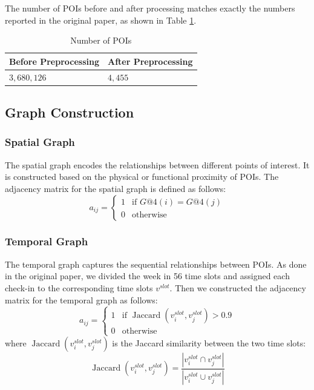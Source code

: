 \documentclass[twocolumn,twoside]{article}
\DeclareMathOperator{\jax}{Jaccard}
\begin{document}
The number of POIs before and after processing matches exactly
the numbers reported in the original paper, as shown in Table \ref{tab:poidata}.
\begin{table}
  \caption{Number of POIs}
  \centering
  \begin{tabular}{ll}
    \toprule
    Before Preprocessing & After Preprocessing \\
    \midrule
    \midrule
    $3,680,126$          & $4,455$             \\
    \bottomrule
  \end{tabular}
  \label{tab:poidata}
\end{table}

\subsection{Graph Construction}
\subsubsection{Spatial Graph}
The spatial graph encodes the relationships between
different points of interest. It is constructed based on the
physical or functional proximity of POIs. The adjacency matrix
for the spatial graph is defined as follows:
\begin{equation}
  a_{ij} = \begin{cases}
    1 & \text{if } G@4(i) = G@4(j) \\
    0 & \text{otherwise}
  \end{cases}
\end{equation}
\subsubsection{Temporal Graph}
The temporal graph captures the sequential relationships between
POIs. As done in the original paper,
we divided the week in 56 time slots and assigned each check-in to
the corresponding time slots $v^{slot}$. Then we constructed the adjacency matrix
for the temporal graph as follows:
\begin{equation}
  a_{ij} = \begin{cases}
    1 & \text{if } \jax(v^{slot}_i, v^{slot}_j) > 0.9 \\
    0 & \text{otherwise}
  \end{cases}
\end{equation}
where $\jax(v^{slot}_i, v^{slot}_j)$ is the Jaccard
similarity between the two time slots:
\begin{equation}
  \jax(v^{slot}_i, v^{slot}_j) = \frac{|v^{slot}_i \cap v^{slot}_j|}{|v^{slot}_i \cup v^{slot}_j|}
\end{equation}
\end{document}
